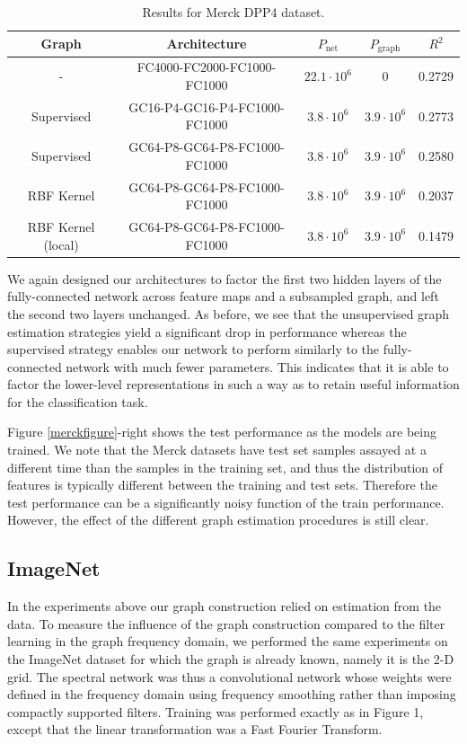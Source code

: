 \begin{table}[H]
\caption{Results for Merck DPP4 dataset.}
\begin{center}
\begin{tabular}{|c|c|c|c|c|}
\hline
Graph & Architecture & $P_\text{net}$ & $P_\text{graph}$ & $R^2$\\ 
\hline
- &FC4000-FC2000-FC1000-FC1000 & $22.1 \cdot 10^6$ & 0 & 0.2729 \\
Supervised & GC16-P4-GC16-P4-FC1000-FC1000 & $3.8\cdot 10^6$ & $3.9 \cdot 10^6$ & 0.2773 \\
Supervised & GC64-P8-GC64-P8-FC1000-FC1000 & $3.8\cdot 10^6$ & $3.9 \cdot 10^6$ &0.2580 \\
RBF Kernel & GC64-P8-GC64-P8-FC1000-FC1000 & $3.8\cdot 10^6$ & $3.9 \cdot 10^6$ &0.2037 \\
RBF Kernel (local) & GC64-P8-GC64-P8-FC1000-FC1000 & $3.8\cdot 10^6$ & $3.9 \cdot 10^6$  &0.1479 \\
\hline
\end{tabular}
\end{center}
\end{table}

We again designed our architectures to factor the first two hidden layers of the fully-connected network across feature maps and a subsampled graph, and left the second two layers unchanged. As before, we see that the unsupervised graph estimation strategies yield a significant drop in performance whereas the supervised strategy enables our network to perform similarly to the fully-connected network with much fewer parameters. This indicates that it is able to factor the lower-level representations in such a way as to retain useful information for the classification task.

Figure \ref{merckfigure}-right shows the test performance as the models are being trained. We note that the Merck datasets have test set samples assayed at a different time than the samples in the training set, and thus the distribution of features is typically different between the training and test sets. Therefore the test performance can be a significantly noisy function of the train performance. However, the effect of the different graph estimation procedures is still clear. 

\subsection{ImageNet}

In the experiments above our graph construction relied on estimation from the data. 
To measure the influence of the graph construction compared to the filter learning in the graph frequency domain, we performed the same experiments on the ImageNet dataset for which the graph is already known, namely it is the 2-D grid. The spectral network was thus a convolutional network whose weights were defined in the frequency domain using frequency smoothing rather than imposing compactly supported filters.
 Training was performed exactly as in Figure 1, except that the linear transformation was a Fast Fourier Transform. 


